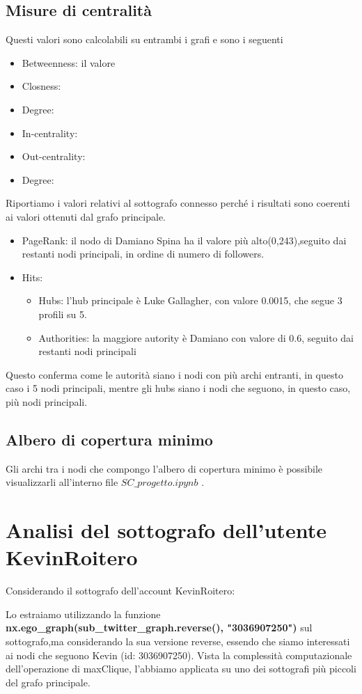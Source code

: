 \documentclass[a4paper,11pt]{report}
\begin{document}
\subsection{Misure di centralità}
Questi valori sono calcolabili su entrambi i grafi e sono i seguenti
		\begin{itemize}
			\item Betweenness: il valore 
			\item Closness: 
			\item Degree: 
			\item In-centrality: 
			\item Out-centrality: 
			\item Degree: 
		\end{itemize}
	Riportiamo i valori relativi al sottografo connesso perché i risultati sono coerenti ai valori ottenuti dal grafo principale.
		\begin{itemize}
		
			\item PageRank: il nodo di Damiano Spina ha il valore più alto(0,243),seguito dai restanti nodi principali, in ordine di numero di followers.
			\item Hits: 
				\begin{itemize}
					\item Hubs: l'hub principale è Luke Gallagher, con valore 0.0015, che segue 3 profili su 5.
					\item Authorities: la maggiore autority è Damiano con valore di 0.6, seguito dai restanti nodi principali
			\end{itemize}
		\end{itemize}
	Questo conferma come le autorità siano i nodi con più archi entranti, in questo caso i 5 nodi principali, mentre gli hubs siano i nodi che seguono, in questo caso, più nodi principali.
\subsection{Albero di copertura minimo}
Gli archi tra i nodi che compongo l'albero di copertura minimo è possibile visualizzarli all'interno file $SC\_progetto.ipynb$ .

\section{Analisi del sottografo dell'utente KevinRoitero}
Considerando il sottografo dell'account KevinRoitero:

Lo estraiamo utilizzando la funzione \textbf{nx.ego\_graph(sub\_twitter\_graph.reverse(), "3036907250")} sul sottografo,ma considerando la sua versione reverse, essendo che siamo interessati ai nodi che seguono Kevin (id: 3036907250).
Vista la complessità computazionale dell'operazione di maxClique, l'abbiamo applicata su uno dei sottografi più piccoli del grafo principale. 
\end{document}
